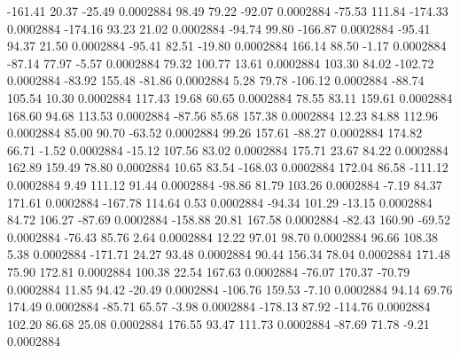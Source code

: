      -161.41       20.37      -25.49     0.0002884
       98.49       79.22      -92.07     0.0002884
      -75.53      111.84     -174.33     0.0002884
     -174.16       93.23       21.02     0.0002884
      -94.74       99.80     -166.87     0.0002884
      -95.41       94.37       21.50     0.0002884
      -95.41       82.51      -19.80     0.0002884
      166.14       88.50       -1.17     0.0002884
      -87.14       77.97       -5.57     0.0002884
       79.32      100.77       13.61     0.0002884
      103.30       84.02     -102.72     0.0002884
      -83.92      155.48      -81.86     0.0002884
        5.28       79.78     -106.12     0.0002884
      -88.74      105.54       10.30     0.0002884
      117.43       19.68       60.65     0.0002884
       78.55       83.11      159.61     0.0002884
      168.60       94.68      113.53     0.0002884
      -87.56       85.68      157.38     0.0002884
       12.23       84.88      112.96     0.0002884
       85.00       90.70      -63.52     0.0002884
       99.26      157.61      -88.27     0.0002884
      174.82       66.71       -1.52     0.0002884
      -15.12      107.56       83.02     0.0002884
      175.71       23.67       84.22     0.0002884
      162.89      159.49       78.80     0.0002884
       10.65       83.54     -168.03     0.0002884
      172.04       86.58     -111.12     0.0002884
        9.49      111.12       91.44     0.0002884
      -98.86       81.79      103.26     0.0002884
       -7.19       84.37      171.61     0.0002884
     -167.78      114.64        0.53     0.0002884
      -94.34      101.29      -13.15     0.0002884
       84.72      106.27      -87.69     0.0002884
     -158.88       20.81      167.58     0.0002884
      -82.43      160.90      -69.52     0.0002884
      -76.43       85.76        2.64     0.0002884
       12.22       97.01       98.70     0.0002884
       96.66      108.38        5.38     0.0002884
     -171.71       24.27       93.48     0.0002884
       90.44      156.34       78.04     0.0002884
      171.48       75.90      172.81     0.0002884
      100.38       22.54      167.63     0.0002884
      -76.07      170.37      -70.79     0.0002884
       11.85       94.42      -20.49     0.0002884
     -106.76      159.53       -7.10     0.0002884
       94.14       69.76      174.49     0.0002884
      -85.71       65.57       -3.98     0.0002884
     -178.13       87.92     -114.76     0.0002884
      102.20       86.68       25.08     0.0002884
      176.55       93.47      111.73     0.0002884
      -87.69       71.78       -9.21     0.0002884
